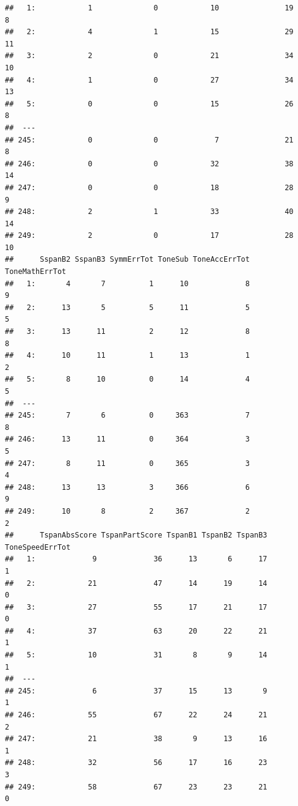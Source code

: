 \documentclass[]{book}
\theoremstyle{definition}
\theoremstyle{definition}
\theoremstyle{definition}
\theoremstyle{remark}
\begin{document}
\begin{verbatim}
##   1:            1              0            10               19       8
##   2:            4              1            15               29      11
##   3:            2              0            21               34      10
##   4:            1              0            27               34      13
##   5:            0              0            15               26       8
##  ---                                                                   
## 245:            0              0             7               21       8
## 246:            0              0            32               38      14
## 247:            0              0            18               28       9
## 248:            2              1            33               40      14
## 249:            2              0            17               28      10
##      SspanB2 SspanB3 SymmErrTot ToneSub ToneAccErrTot ToneMathErrTot
##   1:       4       7          1      10             8              9
##   2:      13       5          5      11             5              5
##   3:      13      11          2      12             8              8
##   4:      10      11          1      13             1              2
##   5:       8      10          0      14             4              5
##  ---                                                                
## 245:       7       6          0     363             7              8
## 246:      13      11          0     364             3              5
## 247:       8      11          0     365             3              4
## 248:      13      13          3     366             6              9
## 249:      10       8          2     367             2              2
##      TspanAbsScore TspanPartScore TspanB1 TspanB2 TspanB3 ToneSpeedErrTot
##   1:             9             36      13       6      17               1
##   2:            21             47      14      19      14               0
##   3:            27             55      17      21      17               0
##   4:            37             63      20      22      21               1
##   5:            10             31       8       9      14               1
##  ---                                                                     
## 245:             6             37      15      13       9               1
## 246:            55             67      22      24      21               2
## 247:            21             38       9      13      16               1
## 248:            32             56      17      16      23               3
## 249:            58             67      23      23      21               0

\end{verbatim}
\end{document}
